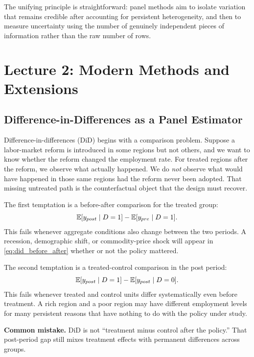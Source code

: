 The unifying principle is straightforward: panel methods aim to isolate variation that remains credible after accounting for persistent heterogeneity, and then to measure uncertainty using the number of genuinely independent pieces of information rather than the raw number of rows.

\section{Lecture 2: Modern Methods and Extensions}

\subsection{Difference-in-Differences as a Panel Estimator}
Difference-in-differences (\ac{DiD}) begins with a comparison problem. Suppose a labor-market reform is introduced in some regions but not others, and we want to know whether the reform changed the employment rate. For treated regions after the reform, we observe what actually happened. We do \emph{not} observe what would have happened in those same regions had the reform never been adopted. That missing untreated path is the counterfactual object that the design must recover.

The first temptation is a before-after comparison for the treated group:
\begin{equation}
\mathbb{E}[y_{post}\mid D=1]-\mathbb{E}[y_{pre}\mid D=1].
\label{eq:did_before_after}
\end{equation}
This fails whenever aggregate conditions also change between the two periods. A recession, demographic shift, or commodity-price shock will appear in \eqref{eq:did_before_after} whether or not the policy mattered.

The second temptation is a treated-control comparison in the post period:
\begin{equation}
\mathbb{E}[y_{post}\mid D=1]-\mathbb{E}[y_{post}\mid D=0].
\label{eq:did_post_gap}
\end{equation}
This fails whenever treated and control units differ systematically even before treatment. A rich region and a poor region may have different employment levels for many persistent reasons that have nothing to do with the policy under study.

\begin{boxF}
\textbf{Common mistake.}
\ac{DiD} is not ``treatment minus control after the policy.'' That post-period gap still mixes treatment effects with permanent differences across groups.
\end{boxF}

